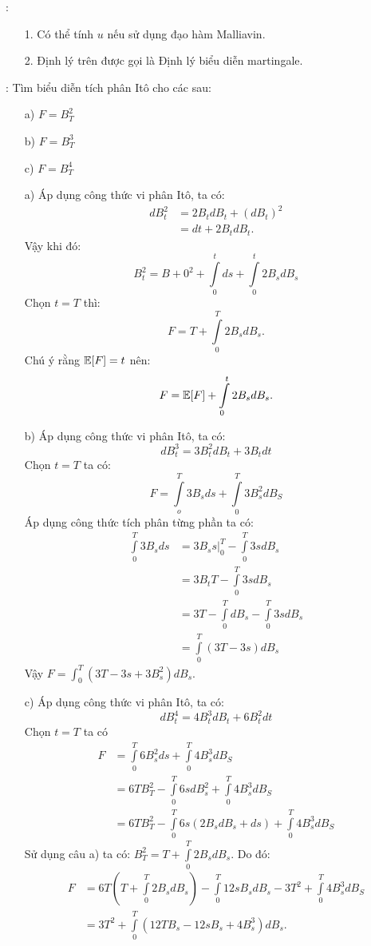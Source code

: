 \remarkname: 
\begin{itemize}
    \item[1.] Có thể tính $u$ nếu sử dụng đạo hàm Malliavin.
    \item[2.] Định lý trên được gọi là Định lý biểu diễn martingale. 
\end{itemize}
\examplename: Tìm biểu diễn tích phân Itô cho các \bnn sau:
\begin{itemize}
    \item[a)] $F =B_T^2$
    \item[b)] $F  = B_T^3$
    \item[c)] $F = B_T^4$ 
\end{itemize}
\begin{sol*}
    \begin{itemize}
        \item[a)] Áp dụng công thức vi phân Itô, ta có:
        \begin{align*}
            dB_t^2 &= 2B_t dB_t + (dB_t)^2 \\
            &= dt + 2B_t dB_t.
        \end{align*}
        Vậy khi đó: 
        \[B_t^2 = B+0^2 + \int\limits_0^t ds+ \int\limits_0^t 2B_s dB_s\]
        Chọn $t=T$ thì: \[F = T + \int\limits_0^T 2B_s dB_s.\]
        Chú ý rằng $\mathbb{E}[F] = t$ nên: \[F = \mathbb{E}[F]+ \int\limits_0^t 2B_s dB_s.\]
        \item[b)]  Áp dụng công thức vi phân Itô, ta có:
        \[dB_t^3 = 3B_t^2 dB_t +3B_t dt\]
        Chọn $t=T$ ta có:
        \[F = \int\limits_o^T 3B_s ds + \int\limits_0^T 3B_s^2 dB_S\]
        Áp dụng công thức tích phân từng phần ta có:
        \begin{align*}
            \int\limits_0^T 3B_s ds &= 3B_s s \Big|_0^T - \int\limits_0^T 3s dB_s\\
            &= 3B_t T - \int\limits_0^T 3s dB_s \\
            &= 3T - \int\limits_0^T dB_s -\int\limits_0^T 3s dB_s\\
            &= \int\limits_0^T (3T-3s) dB_s
        \end{align*}
        Vậy $F = \displaystyle\int_0^T (3T-3s+3B_s^2) dB_s$.
        \item[c)] Áp dụng công thức vi phân Itô, ta có:
        \[dB_t^4 = 4B_t^3 dB_t +6B_t^2 dt\]
        Chọn $t=T$ ta có
        \begin{align*}
            F &= \int\limits_0^T 6B_s^2 ds+ \int\limits_0^T 4B_s^3 dB_S\\
            &= 6TB_T^2 - \int\limits_0^T 6s dB_s^2 + \int\limits_0^T 4B_s^3 dB_S\\
            &= 6TB_T^2 - \int\limits_0^T 6s(2B_sdB_s+ds) + \int\limits_0^T 4B_s^3 dB_S            
        \end{align*}
       Sử dụng câu a) ta có: $B_T^2 = T + \int\limits_0^T 2B_s dB_s$. Do đó:
       \begin{align*}
           F &= 6T\left(T + \int\limits_0^T 2B_s dB_s\right) - \int\limits_0^T 12sB_s dB_s - 3T^2 + \int\limits_0^T 4B_s^3 dB_S \\
           &= 3T^2 + \int\limits_0^T (12TB_s -12sB_s+4B_s^3) dB_s.
       \end{align*}
      
    \end{itemize} 
\end{sol*}